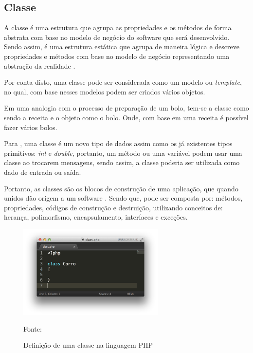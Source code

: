 \subsection{Classe}

A classe é uma estrutura que agrupa as propriedades e os métodos de forma
abstrata com base no modelo de negócio do software que será desenvolvido.
Sendo assim, é uma estrutura estática que agrupa de maneira lógica e descreve
propriedades e métodos com base no modelo de negócio representando uma abstração
da realidade \cite{phpProgramandoComOrientacaoAObjetos}.

Por conta disto, uma classe pode ser considerada como um modelo ou
\textit{template}, no qual, com base nesses modelos podem ser criados vários objetos.

Em uma analogia com o processo de preparação de um bolo, tem-se a classe como
sendo a receita e o objeto como o bolo. Onde, com base em uma receita é possível
fazer vários bolos.

Para , uma classe é um novo tipo de dados assim como os já
existentes tipos primitivos: \textit{int} e \textit{double}, portanto, um método
ou uma variável podem usar uma classe ao trocarem mensagens, sendo assim, a
classe poderia ser utilizada como dado de entrada ou saída.

Portanto, as classes são os blocos de construção de uma aplicação, que quando
unidos dão origem a um software \cite{learningJava}. Sendo que, pode ser
composta por: métodos, propriedades, códigos de construção e destruição,
utilizando conceitos de: herança, polimorfismo, encapsulamento, interfaces e
exceções.

\begin{figure}[h!tb]
	\caption{Definição de uma classe na linguagem PHP}
	\label{fig:classe}

	\centering
	\includegraphics[width=0.65\textwidth]{images/class.png}

	\centering
	\footnotesize Fonte: \fonteOAutor
\end{figure}

